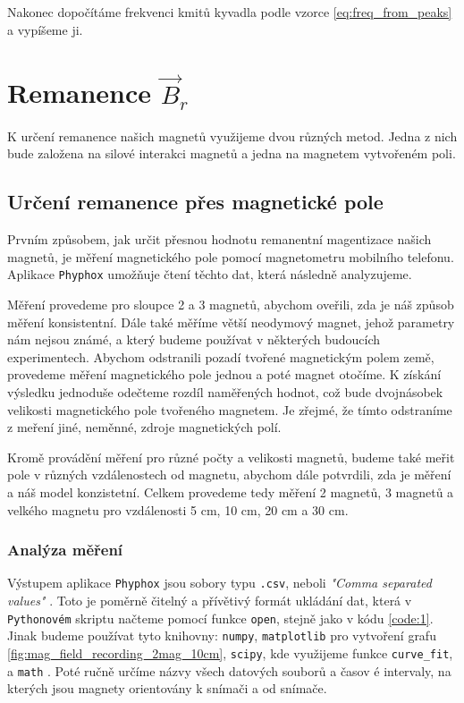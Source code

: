 \documentclass[12pt, a4paper,
 twoside,        %
 openright
]{report}
\begin{document}
Nakonec dopočítáme frekvenci kmitů kyvadla podle vzorce \ref{eq:freq_from_peaks} a vypíšeme ji.



\section{Remanence $\vec{B}_r$}
\label{sec:remanence_measurement}

K určení remanence našich magnetů využijeme dvou různých metod. Jedna z nich bude založena na silové interakci magnetů a jedna na magnetem vytvořeném poli.

\subsection{Určení remanence přes magnetické pole}

Prvním způsobem, jak určit přesnou hodnotu remanentní magentizace našich magnetů, je měření magnetického pole pomocí magnetometru mobilního telefonu.
Aplikace \texttt{Phyphox} umožňuje čtení těchto dat, která následně analyzujeme.

Měření provedeme pro sloupce 2 a 3 magnetů, abychom oveřili, zda je náš způsob měření konsistentní.
Dále také měříme větší neodymový magnet, jehož parametry nám nejsou známé, a který budeme používat v některých budoucích experimentech.
Abychom odstranili pozadí tvořené magnetickým polem země, provedeme měření magnetického pole jednou a poté magnet otočíme.
K získání výsledku jednoduše odečteme rozdíl naměřených hodnot, což bude dvojnásobek velikosti magnetického pole tvořeného magnetem.
Je zřejmé, že tímto odstraníme z meření jiné, neměnné, zdroje magnetických polí.

Kromě provádění měření pro různé počty a velikosti magnetů, budeme také meřit pole v různých vzdálenostech od magnetu, abychom dále potvrdili, zda je měření a náš model konzistetní.
Celkem provedeme tedy měření 2 magnetů, 3 magnetů a velkého magnetu pro vzdálenosti 5 cm, 10 cm, 20 cm a 30 cm.

\subsubsection{Analýza měření}
Výstupem aplikace \texttt{Phyphox} jsou sobory typu \texttt{.csv}, neboli \textit{"Comma separated values"} \cite{csv}.
Toto je poměrně čitelný a přívětivý formát ukládání dat, která v \texttt{Pythonovém} skriptu načteme pomocí funkce \texttt{open}, stejně jako v kódu \ref{code:1}.
Jinak budeme používat tyto knihovny: 
\texttt{numpy}, 
\texttt{matplotlib} pro vytvoření grafu \ref{fig:mag_field_recording_2mag_10cm},
\texttt{scipy}, kde využijeme funkce \texttt{curve\_fit}, a 
\texttt{math} \cite{pymath}.
Poté ručně určíme názvy všech datových souborů a časov  é intervaly, na kterých jsou magnety orientovány k snímači a od snímače.
\end{document}
